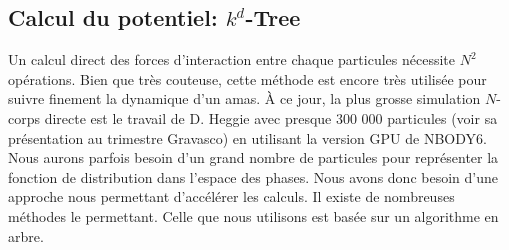 		\subsection{Calcul du potentiel: $k^d$-Tree}
			\label{Sec::KdTree}

			Un calcul direct des forces d'interaction entre chaque particules nécessite $N^2$ opérations. Bien que très couteuse, cette
			méthode est encore très utilisée pour suivre finement la dynamique d'un amas. À ce jour, la plus grosse simulation $N$-corps
			directe est le travail de D. Heggie avec presque 300 000 particules (voir sa présentation au trimestre Gravasco) en utilisant
			la version GPU de NBODY6.
			Nous aurons parfois besoin d'un grand nombre de particules pour représenter
			la fonction de distribution dans l'espace des phases. Nous avons donc besoin d'une approche nous permettant d'accélérer les
			calculs. Il existe de nombreuses méthodes le permettant. Celle que nous utilisons est basée sur un algorithme en arbre.



